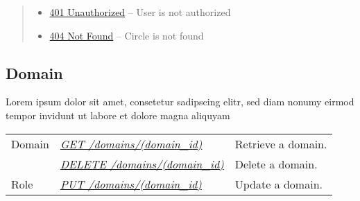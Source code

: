 \documentclass[letterpaper,10pt,english]{sphinxmanual}
\begin{document}
\begin{fulllineitems}
\begin{quote}
\begin{description}
\begin{itemize}
\item {} 
\href{http://www.w3.org/Protocols/rfc2616/rfc2616-sec10.html\#sec10.4.2}{401 Unauthorized} -- User is not authorized

\item {} 
\href{http://www.w3.org/Protocols/rfc2616/rfc2616-sec10.html\#sec10.4.5}{404 Not Found} -- Circle is not found

\end{itemize}

\end{description}\end{quote}

\end{fulllineitems}



\subsection{Domain}
\label{\detokenize{resources/domain:domain}}\label{\detokenize{resources/domain::doc}}
Lorem ipsum dolor sit amet, consetetur sadipscing elitr, sed diam nonumy eirmod tempor invidunt ut labore et dolore magna aliquyam

\noindent\begin{tabulary}{\linewidth}{|L|L|L|}
\hline
{}\relax &\relax &\relax \\
\hline
Domain
&
{\hyperref[\detokenize{resources/domain:get--domains-(domain_id)}]{\emph{GET /domains/(domain\_id)}}}
&
Retrieve a domain.
\\
\hline&
{\hyperref[\detokenize{resources/domain:delete--domains-(domain_id)}]{\emph{DELETE /domains/(domain\_id)}}}
&
Delete a domain.
\\
\hline
Role
&
{\hyperref[\detokenize{resources/domain:put--domains-(domain_id)}]{\emph{PUT /domains/(domain\_id)}}}
&
Update a domain.
\\
\hline\end{tabulary}


\begin{DUlineblock}{0em}
\item[] 
\end{DUlineblock}
\end{document}
